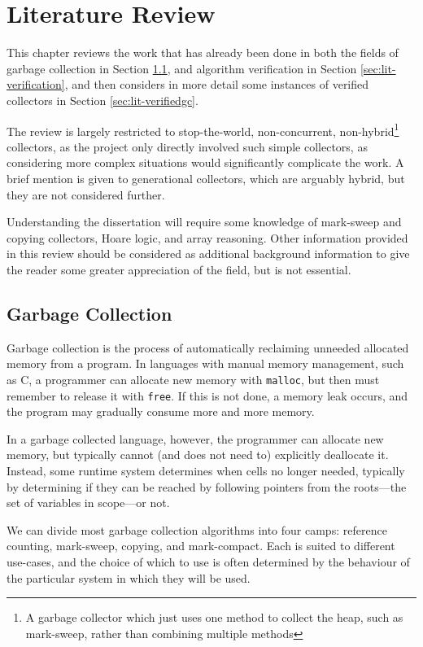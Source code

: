 \chapter{Literature Review}
\label{sec:lit}

This chapter reviews the work that has already been done in both the
fields of garbage collection in Section \ref{sec:lit-gc}, and
algorithm verification in Section \ref{sec:lit-verification}, and then
considers in more detail some instances of verified collectors in
Section \ref{sec:lit-verifiedgc}.

The review is largely restricted to stop-the-world, non-concurrent,
non-hybrid\footnote{A garbage collector which just uses one method to
  collect the heap, such as mark-sweep, rather than combining multiple
  methods} collectors, as the project only directly involved such
simple collectors, as considering more complex situations would
significantly complicate the work. A brief mention is given to
generational collectors, which are arguably hybrid, but they are
not considered further.

Understanding the dissertation will require some knowledge of
mark-sweep and copying collectors, Hoare logic, and array
reasoning. Other information provided in this review should be
considered as additional background information to give the reader
some greater appreciation of the field, but is not essential.

\section{Garbage Collection}
\label{sec:lit-gc}

Garbage collection is the process of automatically reclaiming unneeded
allocated memory from a program\cite{McCarthy60}. In languages with
manual memory management, such as C, a programmer can allocate new
memory with \texttt{malloc}, but then must remember to release it with
\texttt{free}\cite{KandR}. If this is not done, a memory leak occurs,
and the program may gradually consume more and more
memory\cite{Barach82}.

In a garbage collected language, however, the programmer can allocate
new memory, but typically cannot (and does not need to) explicitly
deallocate it. Instead, some runtime system determines when cells no
longer needed, typically by determining if they can be reached by
following pointers from the roots---the set of variables in scope---or
not.

We can divide most garbage collection algorithms into four camps:
reference counting, mark-sweep, copying, and
mark-compact\cite{GarbageCollection}. Each is suited to different
use-cases, and the choice of which to use is often determined by the
behaviour of the particular system in which they will be used.

